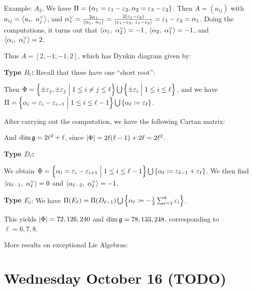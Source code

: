 Example: \(A_2\). We have
\(\Pi = \left\{{\alpha_1 = \varepsilon_1 - \varepsilon_2, \alpha_2 = \varepsilon_3 - \varepsilon_2}\right\}\).
Then \(A = (a_{ij})\) with \(a_{ij} = {\left\langle {a_i},~{a_j^\vee} \right\rangle}\), and
\(\alpha_1^\vee = \frac {2\alpha_1}{{\left\langle {\alpha_1},~{\alpha_1} \right\rangle}} = \frac{2 (\varepsilon_1 - \varepsilon_2)}{{\left\langle {\varepsilon_1 -\varepsilon_2},~{\varepsilon_1 - \varepsilon_2} \right\rangle}} = \varepsilon_1 - \varepsilon_2 = \alpha_1\).
Doing the computations, it turns out that
\({\left\langle {\alpha_1},~{\alpha_2^\vee} \right\rangle} = -1\),
\({\left\langle {\alpha_2},~{\alpha_1^\vee} \right\rangle} = -1\), and
\({\left\langle {\alpha_i},~{\alpha_i^\vee} \right\rangle} = 2\).

Thus \(A = [2, -1; -1, 2]\), which has Dynkin diagram given by:

\textbf{Type \(B_\ell\):} Recall that these have one ``short root'':

Then
\(\Phi = \left\{{\pm \varepsilon_j, \pm \varepsilon_j \mathrel{\Big|} 1 \leq i\neq j \leq \ell}\right\} \bigcup \left\{{\pm \varepsilon_i \mathrel{\Big|} 1 \leq i \leq \ell}\right\}\),
and we have
\(\Pi = \left\{{\alpha_i = \varepsilon_i - \varepsilon_{i-1} \mathrel{\Big|} 1 \leq i \leq \ell-1}\right\} \bigcup \left\{{\alpha_\ell \coloneqq \varepsilon_\ell}\right\}\).

After carrying out the computation, we have the following Cartan matrix:

And \(\dim {\mathfrak{g}} = 2\ell^2 + \ell\), since
\({\left\lvert {\Phi} \right\rvert} = 2\ell(\ell-1) + 2\ell = 2\ell^2\).

\textbf{Type \(D_\ell\):}

We obtain
\(\Phi = \left\{{\alpha_i = \varepsilon_i - \varepsilon_{i+1} \mathrel{\Big|} 1 \leq i \leq \ell-1}\right\} \bigcup \left\{{\alpha_\ell \coloneqq \varepsilon_{\ell-1} + \varepsilon_\ell}\right\}\).
We then find \({\left\langle {\alpha_{\ell-1}},~{\alpha_\ell^\vee} \right\rangle} = 0\) and
\({\left\langle {\alpha_{\ell-2}},~{\alpha_\ell^\vee} \right\rangle} = -1\).

\textbf{Type \(E_\ell\)}: We have
\(\Pi(E_\ell) = \Pi(D_{\ell - 1}) \bigcup \left\{{\alpha_\ell \coloneqq - \frac 1 2 \sum_{i=1}^8 \varepsilon_i}\right\}\).

This yields \({\left\lvert {\Phi} \right\rvert} = 72, 126, 240\) and
\(\dim {\mathfrak{g}} = 78, 133, 248\), corresponding to \(\ell = 6,7,8\).

More results on exceptional Lie Algebras:

\hypertarget{wednesday-october-16-todo}{%
\section{Wednesday October 16 (TODO)}\label{wednesday-october-16-todo}}

